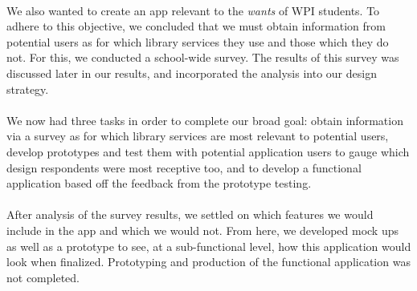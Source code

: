     \paragraph{}
    We also wanted to create an app relevant to the \textit{wants} of WPI students. To adhere to this objective, we concluded that we must obtain information from potential users as for which library services they use and those which they do not. For this, we conducted a school-wide survey. The results of this survey was discussed later in our results, and incorporated the analysis into our design strategy.
    \paragraph{}
    We now had three tasks in order to complete our broad goal: obtain information via a survey as for which library services are most relevant to potential users, develop prototypes and test them with potential application users to gauge which design respondents were most receptive too, and to develop a functional application based off the feedback from the prototype testing.  
    \paragraph{}
    After analysis of the survey results, we settled on which features we would include in the app and which we would not. From here, we developed mock ups as well as a prototype to see, at a sub-functional level, how this application would look when finalized. Prototyping and production of the functional application was not completed.
    \newpage



 

